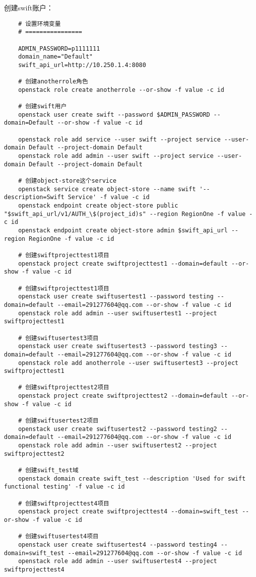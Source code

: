 \documentclass[a4paper,left=1.5cm,right=1.5cm,11pt]{article}
\begin{document}
	创建swift账户：
	\begin{lstlisting}
	# 设置环境变量
	# ================

	ADMIN_PASSWORD=p1111111
	domain_name="Default"
	swift_api_url=http://10.250.1.4:8080

	# 创建anotherrole角色
	openstack role create anotherrole --or-show -f value -c id
	
	# 创建swift用户
	openstack user create swift --password $ADMIN_PASSWORD --domain=Default --or-show -f value -c id
	
	openstack role add service --user swift --project service --user-domain Default --project-domain Default
	openstack role add admin --user swift --project service --user-domain Default --project-domain Default

	# 创建object-store这个service
	openstack service create object-store --name swift '--description=Swift Service' -f value -c id
	openstack endpoint create object-store public "$swift_api_url/v1/AUTH_\$(project_id)s" --region RegionOne -f value -c id
	openstack endpoint create object-store admin $swift_api_url --region RegionOne -f value -c id

	# 创建swiftprojecttest1项目
	openstack project create swiftprojecttest1 --domain=default --or-show -f value -c id

	# 创建swiftprojecttest1项目	
	openstack user create swiftusertest1 --password testing --domain=default --email=291277604@qq.com --or-show -f value -c id
	openstack role add admin --user swiftusertest1 --project swiftprojecttest1

	# 创建swiftusertest3项目
	openstack user create swiftusertest3 --password testing3 --domain=default --email=291277604@qq.com --or-show -f value -c id
	openstack role add anotherrole --user swiftusertest3 --project swiftprojecttest1

	# 创建swiftprojecttest2项目
	openstack project create swiftprojecttest2 --domain=default --or-show -f value -c id

	# 创建swiftusertest2项目
	openstack user create swiftusertest2 --password testing2 --domain=default --email=291277604@qq.com --or-show -f value -c id
	openstack role add admin --user swiftusertest2 --project swiftprojecttest2

	# 创建swift_test域	
	openstack domain create swift_test --description 'Used for swift functional testing' -f value -c id

	# 创建swiftprojecttest4项目
	openstack project create swiftprojecttest4 --domain=swift_test --or-show -f value -c id

	# 创建swiftusertest4项目	
	openstack user create swiftusertest4 --password testing4 --domain=swift_test --email=291277604@qq.com --or-show -f value -c id
	openstack role add admin --user swiftusertest4 --project swiftprojecttest4
	\end{lstlisting}
\end{document}
